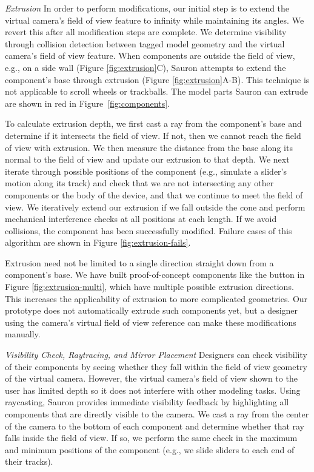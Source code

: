\emph{Extrusion}
In order to perform modifications, our initial step is to extend the virtual camera's field of view feature to infinity while maintaining its angles.  We revert this after all modification steps are complete.  We determine visibility through collision detection between tagged model geometry and the virtual camera's field of view feature.
When components are outside the field of view, e.g., on a side wall (Figure \ref{fig:extrusion}C), Sauron attempts to extend the component's base through extrusion (Figure \ref{fig:extrusion}A-B).  This technique is not applicable to scroll wheels or trackballs.  The model parts Sauron can extrude are shown in red in Figure~\ref{fig:components}.

To calculate extrusion depth, we first cast a ray from the component's base and determine if it intersects the field of view.  If not, then we cannot reach the field of view with extrusion.  We then measure the distance from the base along its normal to the field of view and update our extrusion to that depth.  We next iterate through possible positions of the component (e.g., simulate a slider's motion along its track) and check that we are not intersecting any other components or the body of the device, and that we continue to meet the field of view.  We iteratively extend our extrusion if we fall outside the cone and perform mechanical interference checks at all positions at each length.  If we avoid collisions, the component has been successfully modified.   Failure cases of this algorithm are shown in Figure \ref{fig:extrusion-fails}.

Extrusion need not be limited to a single direction straight down from a component's base.  We have built proof-of-concept components like the button in Figure \ref{fig:extrusion-multi}, which have multiple possible extrusion directions.  This increases the applicability of extrusion to more complicated geometries.  Our prototype does not automatically extrude such components yet, but a designer using the camera's virtual field of view reference can make these modifications manually.


\emph{Visibility Check, Raytracing, and Mirror Placement}
Designers can check visibility of their components by seeing whether they fall within the field of view geometry of the virtual camera. However, the virtual camera's field of view shown to the user has limited depth so it does not interfere with other modeling tasks. Using raycasting, Sauron  provides immediate visibility feedback by highlighting all components that are directly visible to the camera. We cast a ray from the center of the camera to the bottom of each component and determine whether that ray falls inside the field of view. If so, we perform the same check in the maximum and minimum positions of the component (e.g., we slide sliders to each end of their tracks). %

